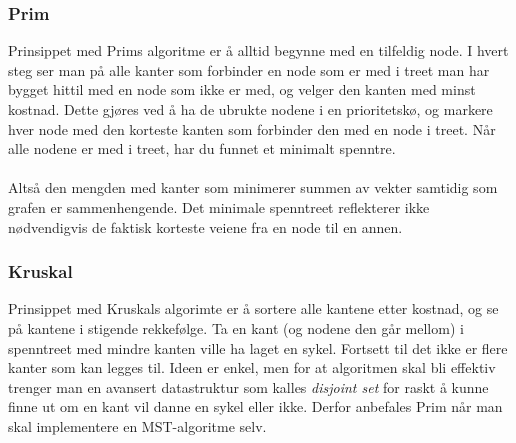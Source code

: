 \subsubsection{Prim}
Prinsippet med Prims algoritme er å alltid begynne med en tilfeldig node. I hvert steg ser man på alle kanter som forbinder en node som er med i treet man har bygget hittil med en node som ikke er med, og velger den kanten med minst kostnad. Dette gjøres ved å ha de ubrukte nodene i en prioritetskø, og markere hver node med den korteste kanten som forbinder den med en node i treet. Når alle nodene er med i treet, har du funnet et minimalt spenntre.
\\\\
Altså den mengden med kanter som minimerer summen av vekter samtidig som grafen er sammenhengende. Det minimale spenntreet reflekterer ikke nødvendigvis de faktisk korteste veiene fra en node til en annen.

\subsubsection{Kruskal}
Prinsippet med Kruskals algorimte er å sortere alle kantene etter kostnad, og se på kantene i stigende rekkefølge. Ta en kant (og nodene den går mellom) i spenntreet med mindre kanten ville ha laget en sykel. Fortsett til det ikke er flere kanter som kan legges til. Ideen er enkel, men for at algoritmen skal bli effektiv trenger man en avansert datastruktur som kalles \textit{disjoint set} for raskt å kunne finne ut om en kant vil danne en sykel eller ikke. Derfor anbefales Prim når man skal implementere en MST-algoritme selv.
